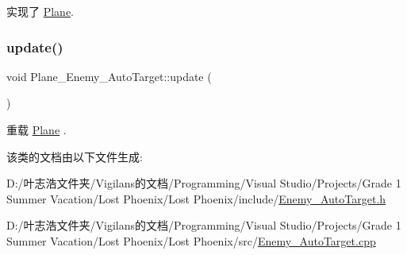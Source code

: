 实现了 \hyperlink{class_plane_af999499b5e79309d94004e8d012fe9c4}{Plane}.

\mbox{\label{class_plane___enemy___auto_target_acae2a6f38bdc71d17188e2b7711f4d5b}} 
\subsubsection{\texorpdfstring{update()}{update()}}
{\footnotesize\ttfamily void Plane\+\_\+\+Enemy\+\_\+\+Auto\+Target\+::update (\begin{DoxyParamCaption}{ }\end{DoxyParamCaption})\hspace{0.3cm}{\ttfamily [virtual]}}



重载 \hyperlink{class_plane_a7fbb07f76503fe057772e01f542afc32}{Plane} .



该类的文档由以下文件生成\+:\begin{DoxyCompactItemize}
\item 
D\+:/叶志浩文件夹/\+Vigilans的文档/\+Programming/\+Visual Studio/\+Projects/\+Grade 1 Summer Vacation/\+Lost Phoenix/\+Lost Phoenix/include/\hyperlink{_enemy___auto_target_8h}{Enemy\+\_\+\+Auto\+Target.\+h}\item 
D\+:/叶志浩文件夹/\+Vigilans的文档/\+Programming/\+Visual Studio/\+Projects/\+Grade 1 Summer Vacation/\+Lost Phoenix/\+Lost Phoenix/src/\hyperlink{_enemy___auto_target_8cpp}{Enemy\+\_\+\+Auto\+Target.\+cpp}\end{DoxyCompactItemize}
